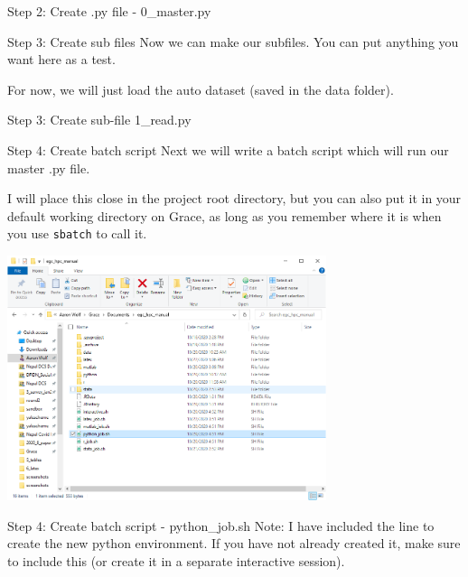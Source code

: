 \documentclass[10pt,xcolor={svgnames}]{beamer}
\begin{document}
\begin{frame}[fragile]{Step 2: Create .py file - 0\_master.py}
\center
{}
\end{frame}


\begin{frame}{Step 3: Create sub files}
Now we can make our subfiles. You can put anything you want here as a test. 

For now, we will just load the auto dataset (saved in the data folder).
\end{frame}

\begin{frame}[fragile]{Step 3: Create sub-file 1\_read.py}
\center
{}
\end{frame}

\begin{frame}{Step 4: Create batch script} 
\center
Next we will write a batch script which will run our master .py file.

I will place this close in the project root directory, but you can also put it in your default working directory on Grace, as long as you remember where it is when you use \texttt{sbatch} to call it.

\includegraphics[width=0.7\textwidth]{screenshots/fig13c.PNG} 

\end{frame}


\begin{frame}[fragile]{Step 4: Create batch script - python\_job.sh}
Note: I have included the line to create the new python environment. If you have not already created it, make sure to include this (or create it in a separate interactive session).
\center

\end{frame}
\end{document}
